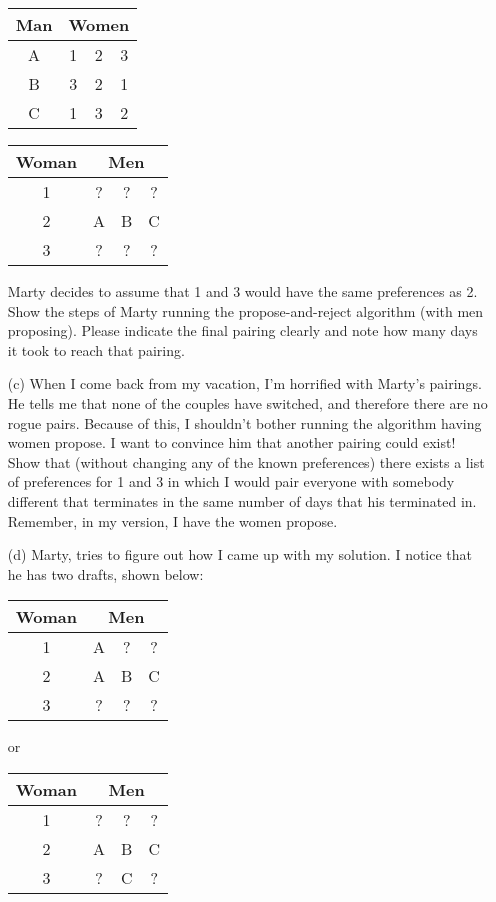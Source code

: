 \documentclass[11pt]{article}
\begin{document}
\begin{qunlist}
\begin{itemize}
\begin{center}
\begin{tabular}{|c|ccc|}\hline 
Man&\multicolumn{3}{|c|}{Women}\\\hline 
A&1&2&3\\\hline 
B&3&2&1\\\hline 
C&1&3&2\\\hline
\end{tabular} 
\hspace{2cm}
\begin{tabular}{|c|ccc|}\hline 
Woman&\multicolumn{3}{|c|}{Men}\\\hline 
1&?&?&?\\\hline 
2&A&B&C\\\hline 
3&?&?&?\\\hline
\end{tabular}
\end{center}
   
   Marty decides to assume that 1 and 3 would have the same preferences as 2. Show the steps of Marty running the propose-and-reject algorithm (with men proposing). Please indicate the final pairing clearly and note how many days it took to reach that pairing.

\item[(c)] When I come back from my vacation, I'm horrified with Marty's pairings. He tells me that none of the couples have switched, and therefore there are no rogue pairs. Because of this, I shouldn't bother running the algorithm having women propose. I want to convince him that another pairing could exist! Show that (without changing any of the known preferences) there exists a list of preferences for 1 and 3 in which I would pair everyone with somebody different that terminates in the same number of days that his terminated in. Remember, in my version, I have the women propose.

\item[(d)] Marty, tries to figure out how I came up with my solution. I notice that he has two drafts, shown below:

\begin{center}
\begin{tabular}{|c|ccc|}\hline 
Woman&\multicolumn{3}{|c|}{Men}\\\hline 
1&A&?&?\\\hline 
2&A&B&C\\\hline 
3&?&?&?\\\hline
\end{tabular} 
or 
\hspace{2cm}
\begin{tabular}{|c|ccc|}\hline 
Woman&\multicolumn{3}{|c|}{Men}\\\hline 
1&?&?&?\\\hline 
2&A&B&C\\\hline 
3&?&C&?\\\hline
\end{tabular}
\end{center}
 

\end{itemize}
\end{qunlist}
\end{document}
